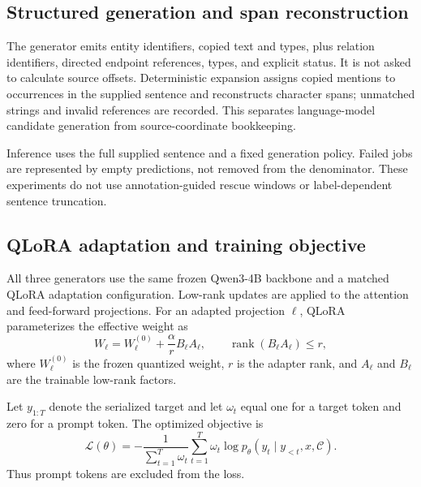 \documentclass[a4paper,fleqn,numbers,doubleblind]{cas-dc}
\begin{document}
\subsection{Structured generation and span reconstruction}
The generator emits entity identifiers, copied text and types, plus relation
identifiers, directed endpoint references, types, and explicit status. It is
not asked to calculate source offsets. Deterministic expansion assigns copied
mentions to occurrences in the supplied sentence and reconstructs character
spans; unmatched strings and invalid references are recorded. This separates
language-model candidate generation from source-coordinate bookkeeping.

Inference uses the full supplied sentence and a fixed generation policy.
Failed jobs are represented by empty predictions, not removed from the
denominator. These experiments do not use annotation-guided rescue windows or
label-dependent sentence truncation.

\subsection{QLoRA adaptation and training objective}
All three generators use the same frozen Qwen3-4B backbone and a matched
QLoRA adaptation configuration. Low-rank updates are applied to the attention and
feed-forward projections. For an adapted projection $\ell$, QLoRA parameterizes
the effective weight as
\begin{equation}
W_{\ell}=W_{\ell}^{(0)}+\frac{\alpha}{r}B_{\ell}A_{\ell},
\qquad \operatorname{rank}(B_{\ell}A_{\ell})\leq r,
\label{eq:qlora}
\end{equation}
where $W_{\ell}^{(0)}$ is the frozen quantized weight, $r$ is the adapter rank,
and $A_{\ell}$ and $B_{\ell}$ are the trainable low-rank factors.

Let $y_{1:T}$ denote the serialized target and let $\omega_t$ equal one for a
target token and zero for a prompt token. The optimized objective is
\begin{equation}
\mathcal L(\theta)
=-\frac{1}{\sum_{t=1}^{T}\omega_t}
\sum_{t=1}^{T}\omega_t
\log p_{\theta}(y_t\mid y_{<t},x,\mathcal C).
\label{eq:training-objective}
\end{equation}
Thus prompt tokens are excluded from the loss.
\end{document}
